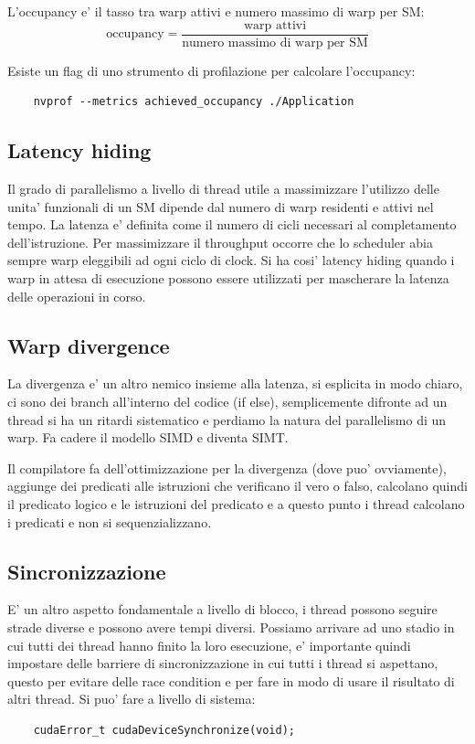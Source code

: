 L'occupancy e' il tasso tra warp attivi e numero massimo di warp per SM:
\[
\text{occupancy} = \frac{\text{warp attivi}}{\text{numero massimo di warp per SM}}
\]

Esiste un flag di uno strumento di profilazione per calcolare l'occupancy:
\begin{lstlisting}
    nvprof --metrics achieved_occupancy ./Application
\end{lstlisting}

\subsection{Latency hiding}
Il grado di parallelismo a livello di thread utile a massimizzare l'utilizzo delle unita' funzionali di un SM dipende dal numero di warp residenti e attivi nel tempo. 
La latenza e' definita come il numero di cicli necessari al completamento dell'istruzione. Per massimizzare il throughput occorre che lo scheduler abia sempre warp eleggibili ad ogni ciclo di clock. Si ha cosi' latency hiding quando i warp in attesa di esecuzione possono essere utilizzati per mascherare la latenza delle operazioni in corso.

\subsection{Warp divergence}
La divergenza e' un altro nemico insieme alla latenza, si esplicita in modo chiaro, ci sono dei branch all'interno del codice (if else), semplicemente difronte ad un thread si ha un ritardi sistematico e perdiamo la natura del parallelismo di un warp. Fa cadere il modello SIMD e diventa SIMT.

Il compilatore fa dell'ottimizzazione per la divergenza (dove puo' ovviamente), aggiunge dei predicati alle istruzioni che verificano il vero o falso, calcolano quindi il predicato logico e le istruzioni del predicato e a questo punto i thread calcolano i predicati e non si sequenzializzano.

\subsection{Sincronizzazione}
E' un altro aspetto fondamentale a livello di blocco, i thread possono seguire strade diverse e possono avere tempi diversi. Possiamo arrivare ad uno stadio in cui tutti dei thread hanno finito la loro esecuzione, e' importante quindi impostare delle barriere di sincronizzazione in cui tutti i thread si aspettano, questo per evitare delle race condition e per fare in modo di usare il risultato di altri thread.
Si puo' fare a livello di sistema:
\begin{lstlisting}
    cudaError_t cudaDeviceSynchronize(void);
\end{lstlisting}

